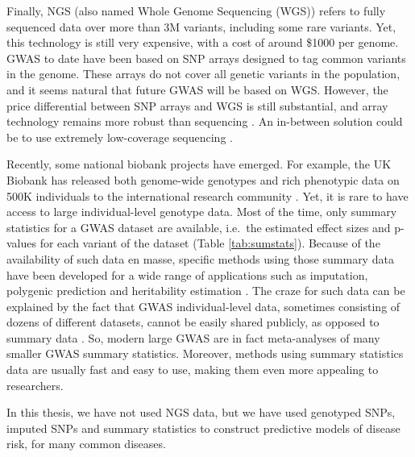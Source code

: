 Finally, NGS (also named Whole Genome Sequencing (WGS)) refers to fully sequenced data over more than 3M variants, including some rare variants. Yet, this technology is still very expensive, with a cost of around \$1000 per genome.
GWAS to date have been based on SNP arrays designed to tag common variants in the genome. These arrays do not cover all genetic variants in the population, and it seems natural that future GWAS will be based on WGS. However, the price differential between SNP arrays and WGS is still substantial, and array technology remains more robust than sequencing \cite[]{visscher201710}. An in-between solution could be to use extremely low-coverage sequencing \cite[]{pasaniuc2012extremely}.

Recently, some national biobank projects have emerged. For example, the UK Biobank has released both genome-wide genotypes and rich phenotypic data on 500K individuals to the international research community \cite[]{bycroft2017genome}.
Yet, it is rare to have access to large individual-level genotype data. 
Most of the time, only summary statistics for a GWAS dataset are available, i.e.\ the estimated effect sizes and p-values for each variant of the dataset (Table \ref{tab:sumstats}). Because of the availability of such data en masse, specific methods using those summary data have been developed for a wide range of applications such as imputation, polygenic prediction and heritability estimation \cite[]{pasaniuc2014fast,vilhjalmsson2015modeling,bulik2015ld,pasaniuc2017dissecting,speed2018sumher}. The craze for such data can be explained by the fact that GWAS individual-level data, sometimes consisting of dozens of different datasets, cannot be easily shared publicly, as opposed to summary data \cite[]{lin2010meta}.
So, modern large GWAS are in fact meta-analyses of many smaller GWAS summary statistics.
Moreover, methods using summary statistics data are usually fast and easy to use, making them even more appealing to researchers.

In this thesis, we have not used NGS data, but we have used genotyped SNPs, imputed SNPs and summary statistics to construct predictive models of disease risk, for many common diseases.


